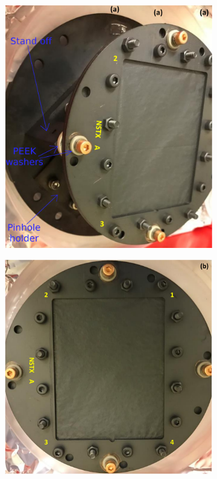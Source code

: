 \begin{figure}[!ht]
     \centering
     \begin{subfigure}{0.35\linewidth}
         \centering
         \includegraphics[trim={0 0 600 0},clip,width=\textwidth]{Chapters/chapter2/figs/foil_markings3.png}
         \label{fig:foil markings1}
     \end{subfigure}
     \begin{subfigure}{0.63
     \linewidth}
         \centering
         \includegraphics[trim={50 0 0 0},clip,width=\textwidth]{Chapters/chapter2/figs/foil_markings.png}

\end{subfigure}
\end{figure}
